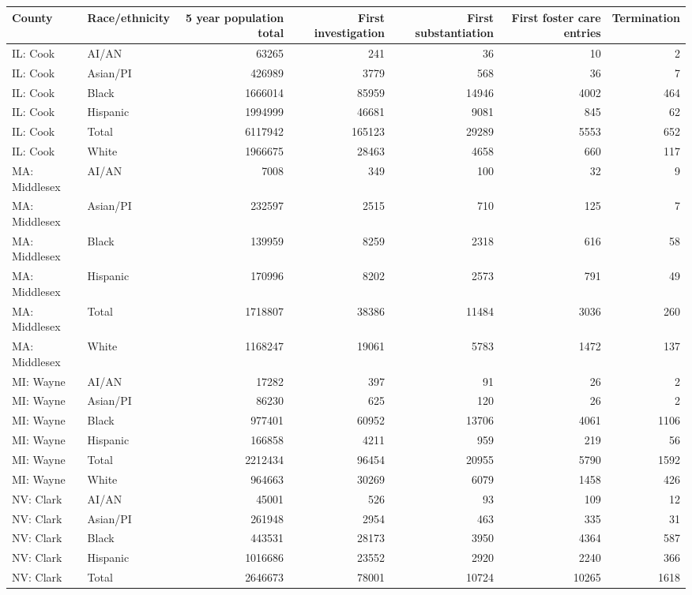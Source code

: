 \documentclass[9pt,twoside,lineno]{pnas-new}
\begin{document}
\begin{table}[ht]
\centering
\begin{tabular}{llrrrrr}
  \hline
County & Race/ethnicity & 5 year population total & First investigation & First substantiation & First foster care entries & Termination \\ 
  \hline
  IL: Cook & AI/AN & 63265 & 241 & 36 & 10 & 2 \\ 
  IL: Cook & Asian/PI & 426989 & 3779 & 568 & 36 & 7 \\ 
  IL: Cook & Black & 1666014 & 85959 & 14946 & 4002 & 464 \\ 
  IL: Cook & Hispanic & 1994999 & 46681 & 9081 & 845 & 62 \\ 
  IL: Cook & Total & 6117942 & 165123 & 29289 & 5553 & 652 \\ 
  IL: Cook & White & 1966675 & 28463 & 4658 & 660 & 117 \\ 
  MA: Middlesex & AI/AN & 7008 & 349 & 100 & 32 & 9 \\ 
  MA: Middlesex & Asian/PI & 232597 & 2515 & 710 & 125 & 7 \\ 
  MA: Middlesex & Black & 139959 & 8259 & 2318 & 616 & 58 \\ 
  MA: Middlesex & Hispanic & 170996 & 8202 & 2573 & 791 & 49 \\ 
  MA: Middlesex & Total & 1718807 & 38386 & 11484 & 3036 & 260 \\ 
  MA: Middlesex & White & 1168247 & 19061 & 5783 & 1472 & 137 \\ 
  MI: Wayne & AI/AN & 17282 & 397 & 91 & 26 & 2 \\ 
  MI: Wayne & Asian/PI & 86230 & 625 & 120 & 26 & 2 \\ 
  MI: Wayne & Black & 977401 & 60952 & 13706 & 4061 & 1106 \\ 
  MI: Wayne & Hispanic & 166858 & 4211 & 959 & 219 & 56 \\ 
  MI: Wayne & Total & 2212434 & 96454 & 20955 & 5790 & 1592 \\ 
  MI: Wayne & White & 964663 & 30269 & 6079 & 1458 & 426 \\ 
  NV: Clark & AI/AN & 45001 & 526 & 93 & 109 & 12 \\ 
  NV: Clark & Asian/PI & 261948 & 2954 & 463 & 335 & 31 \\ 
  NV: Clark & Black & 443531 & 28173 & 3950 & 4364 & 587 \\ 
  NV: Clark & Hispanic & 1016686 & 23552 & 2920 & 2240 & 366 \\ 
  NV: Clark & Total & 2646673 & 78001 & 10724 & 10265 & 1618 \\ 

\end{tabular}
\end{table}
\end{document}
